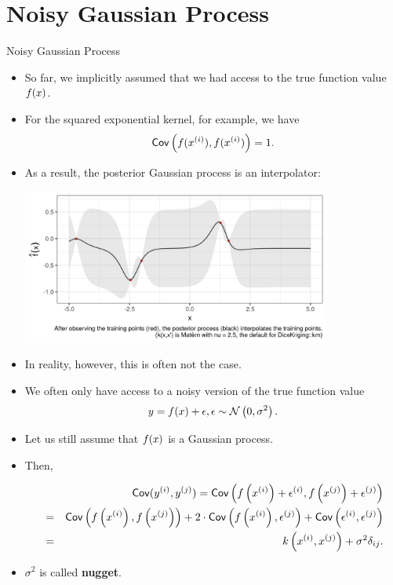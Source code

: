\section{Noisy Gaussian Process}

\begin{vbframe}{Noisy Gaussian Process}

\begin{itemize}
  \item So far, we implicitly assumed that we had access to the true function value $\fx$.
  \item For the squared exponential kernel, for example, we have
  $$
    \cov\left(f(\xi), f(\xi)\right) = 1.
  $$
  \item As a result, the posterior Gaussian process is an interpolator: 
  \begin{center}
    \includegraphics[width=0.8\textwidth]{figure_man/gp-interpolator.png}
  \end{center}

\framebreak 

  \item In reality, however, this is often not the case. 
  \item We often only have access to a noisy version of the true function value
  $$
    y = \fx + \eps, \eps \sim\mathcal{N}\left(0, \sigma^2\right).
  $$
  \item Let us still assume that $\fx$ is a Gaussian process.
  \item Then,
  \begin{footnotesize} 
  \begin{eqnarray*}
    &&\cov(y^{(i)}, y^{(j)}) = \cov\left(f\left(\xi\right) + \epsilon^{(i)}, f\left(\xi[j]\right) + \epsilon^{(j)}\right) \\
    &=& \cov\left(f\left(\xi\right), f\left(\xi[j]\right)\right) + 2 \cdot \cov\left(f\left(\xi\right), \epsilon^{(j)}\right) + \cov\left(\epsilon^{(i)}, \epsilon^{(j)}\right) 
    \\ &=& k\left(\xi, \xi[j]\right) + \sigma^2 \delta_{ij}. 
  \end{eqnarray*}
  \end{footnotesize}
  \item $\sigma^2$ is called \textbf{nugget}. 
\end{itemize}


\end{vbframe}
